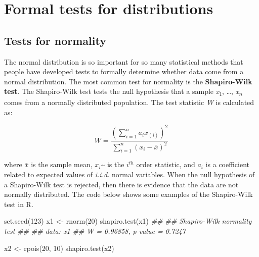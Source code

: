 \documentclass[
  13,
  letterpaper,
]{report}
\newenvironment{Shaded}{\begin{snugshade}}{\end{snugshade}}
\newcommand{\DecValTok}[1]{\textcolor[rgb]{0.68,0.00,0.00}{#1}}
\newcommand{\DocumentationTok}[1]{\textcolor[rgb]{0.37,0.37,0.37}{\textit{#1}}}
\newcommand{\FunctionTok}[1]{\textcolor[rgb]{0.28,0.35,0.67}{#1}}
\newcommand{\NormalTok}[1]{\textcolor[rgb]{0.00,0.23,0.31}{#1}}
\newcommand{\OtherTok}[1]{\textcolor[rgb]{0.00,0.23,0.31}{#1}}
\begin{document}
\section{Formal tests for distributions}\label{sec-dtest-tests}

\subsection{Tests for normality}\label{sec-dtest-tests-norm}

The normal distribution is so important for so many statistical methods
that people have developed tests to formally determine whether data come
from a normal distribution. The most common test for normality is the
\textbf{Shapiro-Wilk test}. The Shapiro-Wilk test tests the null
hypothesis that a sample \emph{x}\textsubscript{1}, \ldots,
\emph{x\textsubscript{n}} comes from a normally distributed population.
The test statistic \emph{W} is calculated as:

\[W=\frac{\left(\sum_{i=1}^{n}{a_ix_{(i)}}\right)^2}{\sum_{i=1}^{n}\left(x_i-\bar{x}\right)^2}\]

where \(\bar{x}\) is the sample mean, \(x_i\)\textasciitilde{} is the
\(i^{th}\) order statistic, and \(a_i\) is a coefficient related to
expected values of \emph{i.i.d.} normal variables. When the null
hypothesis of a Shapiro-Wilk test is rejected, then there is evidence
that the data are not normally distributed. The code below shows some
examples of the Shapiro-Wilk test in R.

\begin{Shaded}
\begin{Highlighting}[]
\FunctionTok{set.seed}\NormalTok{(}\DecValTok{123}\NormalTok{)}
\NormalTok{x1 }\OtherTok{\textless{}{-}} \FunctionTok{rnorm}\NormalTok{(}\DecValTok{20}\NormalTok{)}
\FunctionTok{shapiro.test}\NormalTok{(x1)}
\DocumentationTok{\#\# }
\DocumentationTok{\#\#  Shapiro{-}Wilk normality test}
\DocumentationTok{\#\# }
\DocumentationTok{\#\# data:  x1}
\DocumentationTok{\#\# W = 0.96858, p{-}value = 0.7247}
\end{Highlighting}
\end{Shaded}

\begin{Shaded}
\begin{Highlighting}[]
\NormalTok{x2 }\OtherTok{\textless{}{-}} \FunctionTok{rpois}\NormalTok{(}\DecValTok{20}\NormalTok{, }\DecValTok{10}\NormalTok{)}
\FunctionTok{shapiro.test}\NormalTok{(x2)}
\end{Highlighting}
\end{Shaded}
\end{document}

